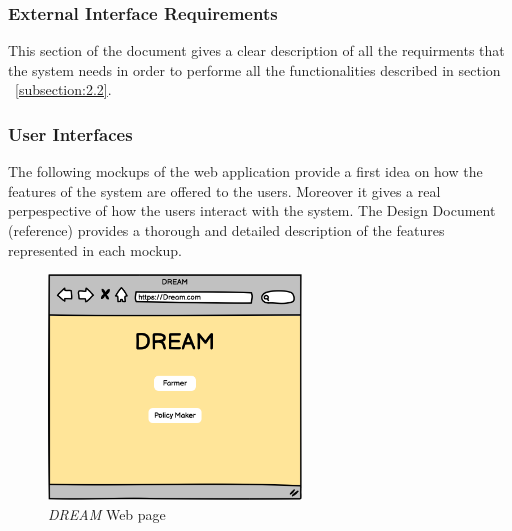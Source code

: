 \subsubsection{External Interface Requirements}
This section of the document gives a clear description of all the requirments that the system needs in order to performe all 
the functionalities described in section ~\ref{subsection:2.2}.

\subsubsection{User Interfaces}
The following mockups of the web application provide a first idea on how the features of the system are offered to the users. 
Moreover it gives a real perpespective of how the users interact with the system. 
The Design Document (reference) provides a thorough and detailed description of the features represented in each mockup.

\begin{figure}[H]
    \begin{center}
    \includegraphics[width=0.6\textwidth]{mocups/Dream.png}
    \caption{\emph{DREAM} Web page}
    \label{fig:webPage}
    \end{center}
\end{figure}
 
